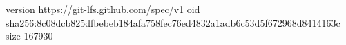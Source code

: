 version https://git-lfs.github.com/spec/v1
oid sha256:8c08dcb825dfbebeb184afa758fec76ed4832a1adb6c53d5f672968d8414163c
size 167930
